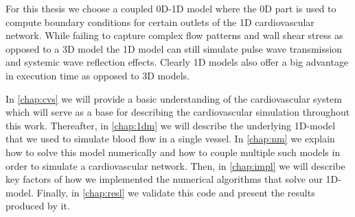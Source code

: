 \documentclass[a4paper, oneside]{discothesis}
\begin{document}
For this thesis we choose a coupled 0D-1D model where the 0D part is used to compute boundary conditions for certain outlets of the 1D cardiovascular network.
While failing to capture complex flow patterns and wall shear stress as opposed to a 3D model the 1D model can still simulate pulse wave transmission and systemic wave reflection effects.
Clearly 1D models also offer a big advantage in execution time as opposed to 3D models. \cite{shi2011review,pfaller2020using,arzani2022machine} 

In \autoref{chap:cvs} we will provide a basic understanding of the cardiovascular system which will serve as a base for describing the cardiovascular simulation throughout this work.
Thereafter, in \autoref{chap:1dm} we will describe the underlying 1D-model that we used to simulate blood flow in a single vessel.
In \autoref{chap:nm} we explain how to solve this model numerically and how to couple multiple such models in order to simulate a cardiovascular network.
Then, in \autoref{chap:impl}  we will describe key factors of how we implemented the numerical algorithms that solve our 1D-model.
Finally, in \autoref{chap:resl} we validate this code and present the results produced by it.








\end{document}
